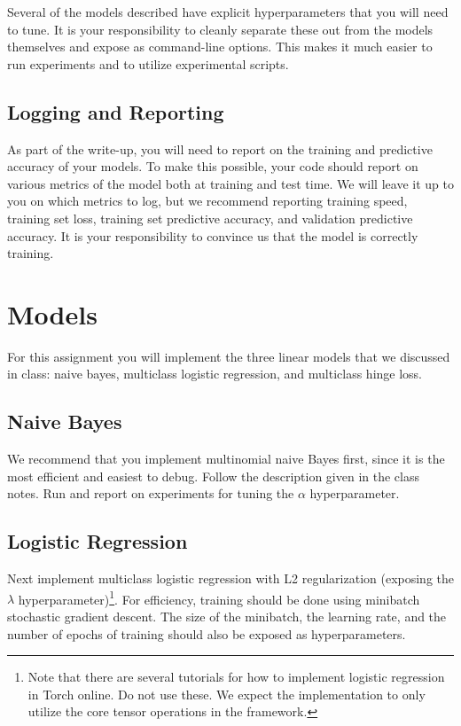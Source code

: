 \documentclass[11pt]{article}
\begin{document}
Several of the models described have explicit hyperparameters that you will 
need to tune. It is your responsibility to cleanly separate these out from 
the models themselves and expose as command-line options. This makes it much 
easier to run experiments and to utilize experimental scripts. 

\subsection{Logging and Reporting}

As part of the write-up, you will need to report on the training and
predictive accuracy of your models. To make this possible, your code
should report on various metrics of the model both at training and
test time. We will leave it up to you on which metrics to log, but we
recommend reporting training speed, training set loss, training set
predictive accuracy, and validation predictive accuracy. It is your
responsibility to convince us that the model is correctly training.

\section{Models}

For this assignment you will implement the three linear models that 
we discussed in class: naive bayes, multiclass logistic regression, 
and multiclass hinge loss.

\subsection{Naive Bayes}

We recommend that you implement multinomial naive Bayes first, since
it is the most efficient and easiest to debug. Follow the description
given in the class notes. Run and report on experiments for tuning the
$\alpha$ hyperparameter.

\subsection{Logistic Regression}

Next implement multiclass logistic regression with L2 regularization
(exposing the $\lambda$ hyperparameter)\footnote{Note that there are several tutorials for how to implement logistic
regression in Torch online. Do not use these. We expect the
implementation to only utilize the core tensor operations in the
framework.}. For efficiency, training
should be done using minibatch stochastic gradient descent. The size
of the minibatch, the learning rate, and the number of epochs of
training should also be exposed as hyperparameters.
\end{document}
